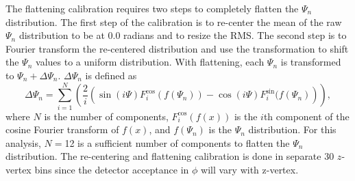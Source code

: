 The flattening calibration requires two steps to completely flatten the $\Psi_n$ distribution. The first step of the calibration is to re-center the mean of the raw $\Psi_n$ distribution to be at 
0.0 radians and to resize the RMS. The second step is to Fourier transform the re-centered distribution and use the transformation to shift the $\Psi_n$ values to a uniform distribution. With flattening, each $\Psi_n$ is transformed to $\Psi_n + \Delta\Psi_n$. $\Delta\Psi_n$ is defined as
\begin{equation}
\Delta\Psi_n = \sum^{N}_{i=1}\left(\frac{2}{i}\left(\sin(i \Psi)F^{\cos}_{i}(f(\Psi_n))-\cos(i \Psi)F^{\sin}_{i}(f(\Psi_n)\right)\right),
\label{eq:deltapsi}
\end{equation}
where $N$ is the number of components, $F^{\cos}_{i}(f(x))$ is the $i$th component of the cosine Fourier transform of $f(x)$, and $f(\Psi_n)$ is the $\Psi_n$ distribution. For this analysis, $N=$12 is a sufficient number of components to flatten the $\Psi_n$ distribution. The re-centering and flattening calibration is done in separate 30 $z$-vertex bins since the detector acceptance in $\phi$ will vary with z-vertex.

